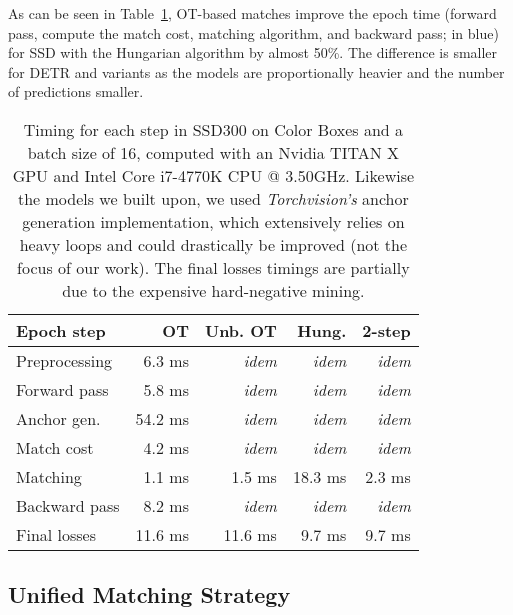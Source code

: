 As can be seen in Table~\ref{tab:ssd_timings}, OT-based matches improve the epoch time (forward pass, compute the match cost, matching algorithm, and backward pass; in blue) for SSD with the Hungarian algorithm by almost 50\%. The difference is smaller for DETR and variants as the models are proportionally heavier and the number of predictions smaller. 
\begin{table}[h!]
    \small
    \centering
    \begin{tabular}{l | rrrr}
    \toprule
        \textbf{Epoch step}         & \textbf{OT} & \textbf{Unb. OT} & \textbf{Hung.} & \textbf{2-step} \\ \midrule
        Preprocessing & 6.3 ms & \textit{idem} & \textit{idem} & \textit{idem} \\
        \rowcolor{blue!10} Forward pass    & 5.8 ms & \textit{idem} & \textit{idem} & \textit{idem} \\
        Anchor gen. & 54.2 ms & \textit{idem} & \textit{idem} & \textit{idem} \\
        \rowcolor{blue!10}Match cost & 4.2 ms & \textit{idem} & \textit{idem} & \textit{idem} \\
        \rowcolor{blue!20}Matching        & 1.1 ms & 1.5 ms & 18.3 ms & 2.3 ms \\
        \rowcolor{blue!10}Backward pass   & 8.2 ms & \textit{idem} & \textit{idem} & \textit{idem} \\
        Final losses  & 11.6 ms & 11.6 ms & 9.7 ms & 9.7 ms \\ 
        \bottomrule
        \end{tabular}
    \caption{Timing for each step in SSD300 on Color Boxes and a batch size of 16, computed with an Nvidia TITAN X GPU and Intel Core i7-4770K CPU @ 3.50GHz. Likewise the models we built upon, we used \textit{Torchvision's} anchor generation implementation, which extensively relies on heavy loops and could drastically be improved (not the focus of our work). The final losses timings are partially due to the expensive hard-negative mining.} %
    \label{tab:ssd_timings}
\end{table}

\subsection{Unified Matching Strategy}
